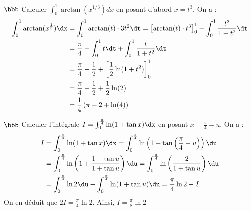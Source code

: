 \documentclass[11pt]{article}
\begin{document}
\begin{exercice}{$\bbb$}{}
    Calculer $\int_0^1{\arctan(x^{1/3})dx}$ en posant d'abord $x=t^3$.
    \tcblower
    On a :
    \begin{align*}
        \int_0^1{\arctan(x^{\frac{1}{3}})\dx}&=\int_0^1{\arctan(t)\cdot3t^2\dt}=\left[\arctan(t)\cdot t^3\right]_0^1 - \int_0^1{\frac{t^3}{1+t^2} \dt}\\
        &=\frac{\pi}{4} - \int_0^1{t\dt}+\int_0^1{\frac{t}{1+t^2}\dt}\\
        &=\frac{\pi}{4} - \frac{1}{2} + \left[\frac{1}{2}\ln(1+t^2)\right]_0^1\\
        &=\frac{\pi}{4} - \frac{1}{2} + \frac{1}{2}\ln(2)\\
        &=\frac{1}{4}\left(\pi - 2 + \ln(4)\right)
    \end{align*}
\end{exercice}

\begin{exercice}{$\bbb$}{}
    Calculer l'intégrale $I = \int_0^{\frac{\pi}{4}}{\ln(1+\tan x)\dx}$ en posant $x=\frac{\pi}{4}-u$.
    \tcblower
    On a :
    \begin{align*}
        I &= \int_0^{\frac{\pi}{4}}{\ln(1+\tan x)\dx} = \int_{0}^{\frac{\pi}{4}}{\ln\left(1+\tan\left(\frac{\pi}{4}-u\right)\right)\du}\\
        &=\int^{\frac{\pi}{4}}_0{\ln\left(1+\frac{1-\tan u}{1+\tan u}\right)\du}=\int_0^{\frac{\pi}{4}}{\ln\left(\frac{2}{1+\tan u}\right)\du}\\
        &=\int_0^{\frac{\pi}{4}}{\ln2\du}-\int_0^{\frac{\pi}{4}}{\ln(1+\tan u)\du} = \frac{\pi}{4}\ln2 - I
    \end{align*}
    On en déduit que $2I = \frac{\pi}{4}\ln2$. Ainsi, $I=\frac{\pi}{8}\ln2$
\end{exercice}
\end{document}
